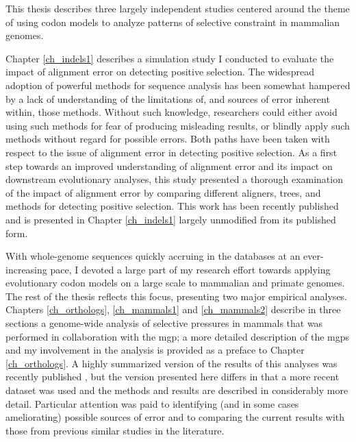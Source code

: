 This thesis describes three largely independent studies centered
around the theme of using codon models to analyze patterns of
selective constraint in mammalian genomes.

Chapter \ref{ch_indels1} describes a simulation study I conducted to
evaluate the impact of alignment error on detecting \sw positive
selection. The widespread adoption of powerful methods for sequence
analysis has been somewhat hampered by a lack of understanding of the
limitations of, and sources of error inherent within, those
methods. Without such knowledge, researchers could either avoid using
such methods for fear of producing misleading results, or blindly
apply such methods without regard for possible errors. Both paths have
been taken with respect to the issue of alignment error in detecting
positive selection. As a first step towards an improved understanding
of alignment error and its impact on downstream evolutionary analyses,
this study presented a thorough examination of the impact of alignment
error by comparing different aligners, trees, and methods for
detecting positive selection. This work has been recently published
\citep{Jordan2011} and is presented in Chapter \ref{ch_indels1}
largely unmodified from its published form.

With whole-genome sequences quickly accruing in the databases at an
ever-increasing pace, I devoted a large part of my research effort
towards applying evolutionary codon models on a large scale to
mammalian and primate genomes. The rest of the thesis reflects this
focus, presenting two major empirical analyses. Chapters
\ref{ch_orthologs}, \ref{ch_mammals1} and \ref{ch_mammals2} describe
in three sections a genome-wide analysis of \sw selective pressures in
mammals that was performed in collaboration with the \acf{mgp}; a more
detailed description of the \acp{mgp} and my involvement in the
analysis is provided as a preface to Chapter \ref{ch_orthologs}. A
highly summarized version of the results of this analyses was recently
published \citep{LindbladToh2011}, but the version presented here
differs in that a more recent dataset was used and the methods and
results are described in considerably more detail. Particular
attention was paid to identifying (and in some cases ameliorating)
possible sources of error and to comparing the current results with
those from previous similar studies in the literature.

